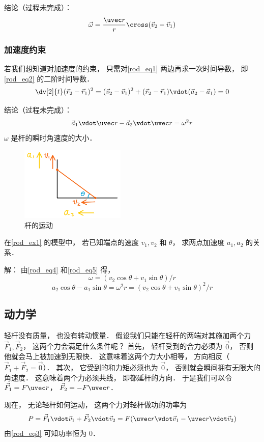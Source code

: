 结论（过程未完成）：
\begin{equation}\label{rod_eq4}
\vec \omega = \frac{\uvec r}{r} \cross (\vec v_2 - \vec v_1)
\end{equation}

\subsubsection{加速度约束}
若我们想知道对加速度的约束， 只需对\autoref{rod_eq1} 两边再求一次时间导数， 即\autoref{rod_eq2} 的二阶时间导数．
\begin{equation}
\dv[2]{t} (\vec r_2 - \vec r_1)^2 = (\vec v_2 - \vec v_1)^2 + (\vec r_2 - \vec r_1) \vdot (\vec a_2 - \vec a_1) = 0
\end{equation}

结论（过程未完成）：
\begin{equation}\label{rod_eq5}
\vec a_1 \vdot \uvec r - \vec a_2 \vdot \uvec r  = \omega^2 r
\end{equation}
$\omega$ 是杆的瞬时角速度的大小．

\begin{exam}{}
\begin{figure}[ht]
\centering
\includegraphics[width=5cm]{./figures/rod2.png}
\caption{杆的运动} \label{rod_fig2}
\end{figure}
在\autoref{rod_ex1} 的模型中， 若已知端点的速度 $v_1, v_2$ 和 $\theta$， 求两点加速度 $a_1, a_2$ 的关系．

解： 由\autoref{rod_eq4} 和\autoref{rod_eq5} 得，
\begin{equation}
\omega = (v_2 \cos\theta + v_1 \sin\theta)/r
\end{equation}
\begin{equation}
a_2 \cos\theta - a_1 \sin\theta = \omega^2 r = (v_2 \cos\theta + v_1 \sin\theta)^2/r
\end{equation}
\end{exam}

\subsection{动力学}
轻杆没有质量， 也没有转动惯量． 假设我们只能在轻杆的两端对其施加两个力 $\vec F_1, \vec F_2$， 这两个力会满足什么条件呢？ 首先， 轻杆受到的合力必须为 $\vec 0$， 否则他就会马上被加速到无限快． 这意味着这两个力大小相等， 方向相反（$\vec F_1 + \vec F_2 = \vec 0$）． 其次， 它受到的和力矩必须也为 $\vec 0$， 否则就会瞬间拥有无限大的角速度． 这意味着两个力必须共线， 即都延杆的方向． 于是我们可以令 $\vec F_1 = F \uvec r$， $\vec F_2 = -F \uvec r$．

现在， 无论轻杆如何运动， 这两个力对轻杆做功的功率为
\begin{equation}
P = \vec F_1 \vdot \vec v_1 + \vec F_2 \vdot \vec v_2 = F (\uvec r \vdot \vec v_1 - \uvec r \vdot \vec v_2)
\end{equation}
由\autoref{rod_eq3} 可知功率恒为 0．
